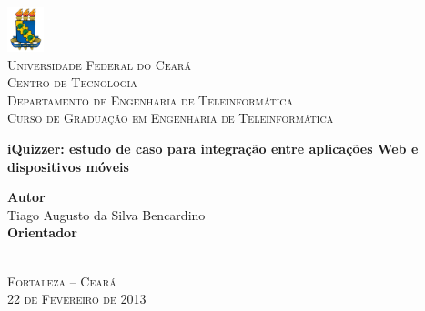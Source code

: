 \thispagestyle{empty}%

\begin{center}
    \includegraphics[width=0.08\textwidth]{figs/ufc.jpg} \\%
    \textsc{
    Universidade Federal do Cear{\'a} \\%
    Centro de Tecnologia \\%
    Departamento de Engenharia de Teleinform{\'a}tica \\%
    Curso de Gradua\c{c}\~{a}o em Engenharia de Teleinform{\'a}tica \\%
    }
    
	\null\vfill%
    \vspace{.5cm}%
    {\LARGE         \textbf{iQuizzer: estudo de caso para integração entre aplicações Web e dispositivos móveis}\\}

    \null\vfill%
    \vspace{.5cm}%
	{\normalsize    \textbf{Autor} \\%
                         Tiago Augusto da Silva Bencardino} \\%

    \null\vfill%
    \vspace{.25cm}%
    {\normalsize    \textbf{Orientador} \\%
                    } \\%

    \null\vfill%
    \vspace{.25cm}%
    
	{\normalsize    \textsc{Fortaleza -- Cear{\'a} \\%
                            22 de Fevereiro de 2013}}
\end{center}
